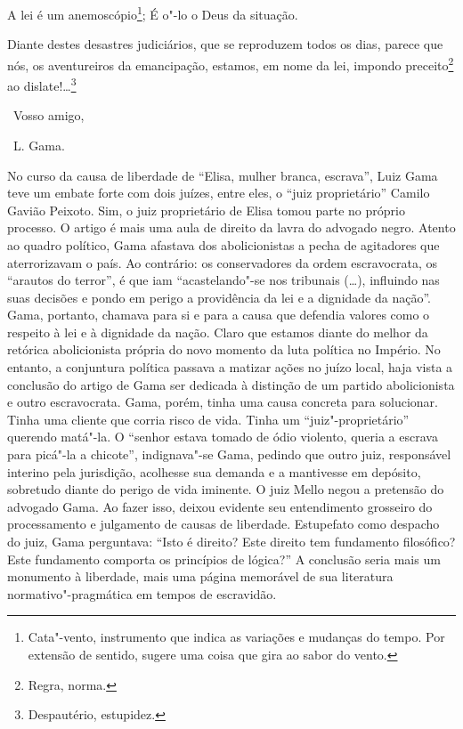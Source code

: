 A lei é um anemoscópio\footnote{Cata"-vento, instrumento que indica as
  variações e mudanças do tempo. Por extensão de sentido, sugere uma
  coisa que gira ao sabor do vento.}; É o"-lo o Deus da situação.

Diante destes desastres judiciários, que se reproduzem todos os dias,
parece que nós, os aventureiros da emancipação, estamos, em nome da lei,
impondo preceito\footnote{Regra, norma.} ao dislate!\ldots{}\footnote{
  Despautério, estupidez.}

\bigskip

\hfill\ Vosso amigo,

\hfill\ L. Gama.
\pagebreak
\mbox{}\vfill
\thispagestyle{empty}

{\small\noindent
No curso da causa de liberdade de
``Elisa, mulher branca, escrava'', Luiz Gama teve um embate forte com dois
juízes, entre eles, o ``juiz proprietário'' Camilo Gavião Peixoto. Sim, o
juiz proprietário de Elisa tomou parte no próprio processo. O artigo é
mais uma aula de direito da lavra do advogado negro. Atento ao quadro
político, Gama afastava dos abolicionistas a pecha de agitadores que
aterrorizavam o país. Ao contrário: os conservadores da ordem
escravocrata, os ``arautos do terror'', é que iam ``acastelando"-se nos
tribunais (\ldots{}), influindo nas suas decisões e pondo em perigo a
providência da lei e a dignidade da nação''. Gama, portanto, chamava para
si e para a causa que defendia valores como o respeito à lei e à
dignidade da nação. Claro que estamos diante do melhor da retórica
abolicionista própria do novo momento da luta política no Império. No
entanto, a conjuntura política passava a matizar ações no juízo local,
haja vista a conclusão do artigo de Gama ser dedicada à distinção de um
partido abolicionista e outro escravocrata. Gama, porém, tinha uma causa
concreta para solucionar. Tinha uma cliente que corria risco de vida.
Tinha um ``juiz"-proprietário'' querendo matá"-la. O ``senhor estava tomado
de ódio violento, queria a escrava para picá"-la a chicote'', indignava"-se
Gama, pedindo que outro juiz, responsável interino pela jurisdição,
acolhesse sua demanda e a mantivesse em depósito, sobretudo diante do
perigo de vida iminente. O juiz Mello negou a pretensão do advogado
Gama. Ao fazer isso, deixou evidente seu entendimento grosseiro
do processamento e julgamento de causas de liberdade. Estupefato como
despacho do juiz, Gama perguntava: ``Isto é direito? Este
direito tem fundamento filosófico? Este fundamento comporta os
princípios de lógica?'' A conclusão seria mais um monumento à liberdade,
mais uma página memorável de sua literatura normativo"-pragmática em
tempos de escravidão.}

